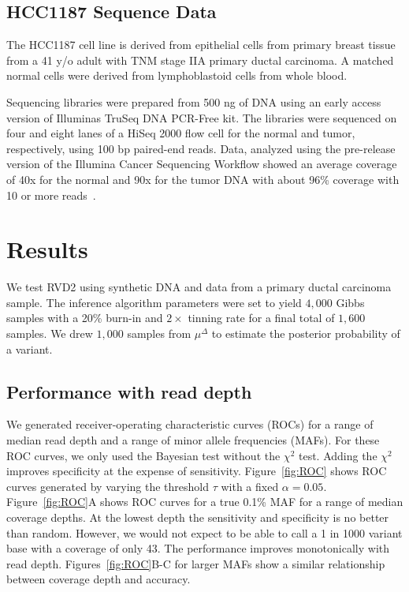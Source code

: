 \documentclass[11pt,reqno]{amsart}
\begin{document}
\subsection{HCC1187 Sequence Data}

The HCC1187 cell line is derived from  epithelial cells from primary breast tissue from a 41 y/o adult with TNM stage IIA primary ductal carcinoma. A matched normal cells were derived from lymphoblastoid cells from whole blood. 

Sequencing libraries were prepared from 500 ng of DNA using an early access version of Illuminas TruSeq DNA PCR-Free kit. The libraries were sequenced on four and eight lanes of a HiSeq 2000 flow cell for the normal and tumor, respectively, using 100 bp paired-end reads. Data, analyzed using the pre-release version of the Illumina Cancer Sequencing Workflow showed an average coverage of 40x for the normal and 90x for the tumor DNA with about 96\% coverage with 10 or more reads~\cite{}.


\section{Results}

We test RVD2 using synthetic DNA and data from a primary ductal carcinoma sample. The inference algorithm parameters were set to yield $4,000$ Gibbs samples with a 20\% burn-in and $2\times$ tinning rate for a final total of $1,600$ samples. We drew $1,000$ samples from $\mu^{\Delta}$ to estimate the posterior probability of a variant.

\subsection{Performance with read depth}\label{sec:read_depth}

We generated receiver-operating characteristic curves (ROCs) for a range of median read depth and a range of minor allele frequencies (MAFs). For these ROC curves, we only used the Bayesian test without the $\chi^2$ test. Adding the $\chi^2$ improves specificity at the expense of sensitivity. Figure~\ref{fig:ROC} shows ROC curves generated by varying the threshold $\tau$ with a fixed $\alpha=0.05$. Figure~\ref{fig:ROC}A shows ROC curves for a true 0.1\% MAF for a range of median coverage depths. At the lowest depth the sensitivity and specificity is no better than random. However, we would not expect to be able to call a 1 in 1000 variant base with a coverage of only 43. The performance improves monotonically with read depth. Figures~\ref{fig:ROC}B-C for larger MAFs show a similar relationship between coverage depth and accuracy.
\end{document}
